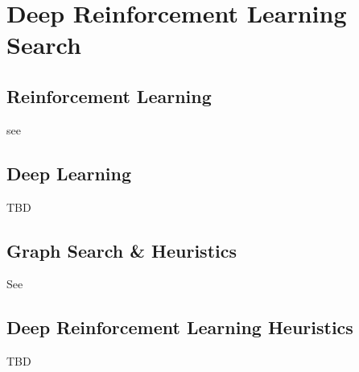 
\chapter{Deep Reinforcement Learning Search} %

\label{Chapter1} %


\section{Reinforcement Learning}

see \cite{Sutton1998}


\section{Deep Learning}

TBD


\section{Graph Search \& Heuristics}

\label{GSH}

See \cite{DBLP:journals/jacm/DechterP85}



\section{Deep Reinforcement Learning Heuristics}

TBD



